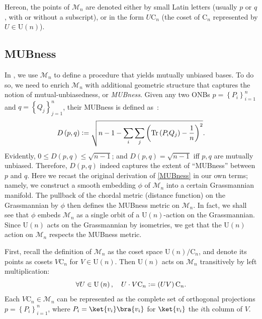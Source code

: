 \documentclass[referee,sn-mathphys-num]{sn-jnl}%
\theoremstyle{thmstyleone}%
\theoremstyle{thmstyletwo}%
\theoremstyle{remark}
\theoremstyle{thmstylethree}%
\DeclareMathOperator{\Tr}{Tr}
\newcommand{\defeq}{\vcentcolon=}
\begin{document}
Hereon, the points of $ \mathcal{M}_n $ are denoted either by small Latin letters (usually $p$ or $q$, with or without a subscript), or in the form $ U \mathrm{C}_n $ (the coset of $ \mathrm{C}_n $ represented by $ U \in \mathrm{U} \left( n \right) $).

\subsection{MUBness}\label{sec:MUBness}
In , we use $\mathcal{M}_n$ to define a procedure that yields mutually unbiased bases. To do so, we need to enrich $\mathcal{M}_n$ with additional geometric structure that captures the notion of mutual-unbiasedness, or \textit{MUBness}.
Given any two ONBs $p = \left\{ P_i \right\}_{i=1}^n $ and $q= \left\{ Q_j \right\}_{j=1}^n$, their MUBness is defined as~\cite{bengtsson2007three}:
\begin{equation}\label{MUBness}
	D \left( p, q \right) \defeq \sqrt{ n-1- \sum_i \sum_j \left( \Tr \left( P_i Q_j \right) -\frac{1}{n} \right)^2} .
\end{equation}
Evidently, $ 0 \leq D \left( p, q \right) \leq \sqrt{ n-1} $; and $ D \left( p, q \right) = \sqrt{ n-1} $ iff $p,q$ are mutually unbiased. Therefore, $D \left( p, q \right)$ indeed captures the extent of ``MUBness'' between $p$ and $q$. Here we recast the original derivation of \eqref{MUBness} in our own terms; namely, we construct a smooth embedding $\phi$ of $ \mathcal{M}_n $ into a certain Grassmannian manifold.
The pullback of the chordal metric (distance function) on the Grassmannian by $\phi$ then defines the MUBness metric on $ \mathcal{M}_n $. In fact, we shall see that $\phi$ embeds $\mathcal{M}_n$ as a single orbit of a $\mathrm{U} \left( n \right)$-action on the Grassmannian. Since $\mathrm{U} \left( n \right)$ acts on the Grassmannian by isometries, we get that the $\mathrm{U} \left( n \right)$ action on $ \mathcal{M}_n $ respects the MUBness metric.

First, recall the definition of $\mathcal{M}_n$ as the coset space $ \mathrm{U} \left( n \right) / \mathrm{C}_n $, and denote its points as cosets $ V \mathrm{C}_n $ for $ V \in \mathrm{U} \left( n \right) $. Then $ \mathrm{U} \left( n \right) $ acts on $\mathcal{M}_n$ transitively by left multiplication:
\begin{equation}\label{Un_action}
	\forall U \in \mathrm{U} \left( n \right) , \quad U \cdot V \mathrm{C}_n \defeq \left( UV \right) \mathrm{C}_n .
\end{equation}
Each $ V \mathrm{C}_n \in \mathcal{M}_n $ can be represented as the complete set of orthogonal projections $ p = \left\{ P_i \right\}_{i=1}^n $, where $ P_i = \ket{v_i} \bra{v_i} $ for $ \ket{v_i} $ the $i$th column of $V$.
\end{document}
